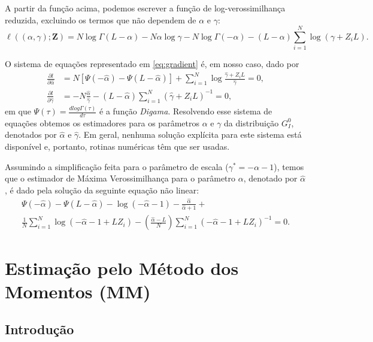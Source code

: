 A partir da função acima, podemos escrever a função de log-verossimilhança reduzida, excluindo os termos que não dependem de $\alpha$ e $\gamma$:
\begin{equation}
    \ell ((\alpha, \gamma); \bm Z) = N\log\Gamma(L-\alpha) - N\alpha \log\gamma - N\log\Gamma(-\alpha) - (L-\alpha)\sum_{i=1}^{N}\log(\gamma +Z_iL). \label{eq:logVerRed}
\end{equation}

O sistema de equações representado em \eqref{eq:gradient} é, em nosso caso, dado por
\begin{align}
  \frac{\partial l}{\partial \widehat{\alpha}} &= N[\Psi(-\widehat{\alpha}) - \Psi(L-\widehat{\alpha})] + \sum_{i=1}^{N}\log\frac{\widehat{\gamma} + Z_iL}{\widehat{\gamma}} = 0,\\
   \frac{\partial l}{\partial \widehat{\gamma}} &= -N\frac{\widehat{\alpha}}{\widehat{\gamma}} - (L - \widehat{\alpha})\sum_{i=1}^{N}(\widehat{\gamma} + Z_iL)^{-1} = 0,
\end{align}
em que $\Psi(\tau) = \frac{\textit{d}log\Gamma(\tau)}{\textit{d}\tau}$ é a função \textit{Digama}. Resolvendo esse sistema de equações obtemos os estimadores para os parâmetros $\alpha$ e $\gamma$ da distribuição $G_I^0$, denotados por $\widehat{\alpha}$ e $\widehat{\gamma}$. Em geral, nenhuma solução explícita para este sistema está disponível e, portanto, rotinas numéricas têm que ser usadas.

Assumindo a simplificação feita para o parâmetro de escala ($\gamma^{*} = -\alpha - 1$), temos que o estimador de Máxima Verossimilhança para o parâmetro $\alpha$, denotado por $\widehat{\alpha}$, é dado pela solução da seguinte equação não linear:
\begin{align}
    \Psi(-\widehat{\alpha}) - \Psi(L-\widehat{\alpha}) - \log(-\widehat{\alpha}-1) - \frac{\widehat{\alpha}}{\widehat{\alpha}+1} + \nonumber \\ 
    \frac{1}{N}\sum_{i=1}^{N}\log(-\widehat{\alpha} - 1 + LZ_i) - \left ( \frac{\widehat{\alpha}-L}{N} \right )\sum_{i=1}^{N}(-\widehat{\alpha} - 1 + LZ_i)^{-1} = 0.
\end{align}

\section{Estimação pelo Método dos Momentos (MM)}

\subsection{Introdução}

